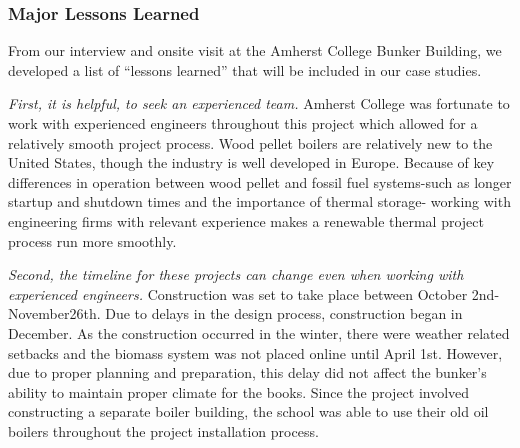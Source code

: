 \subsubsection{Major Lessons Learned}
\par From our interview and onsite visit at the Amherst College Bunker Building, we developed a list of “lessons learned” that will be included in our case studies. 
\par \emph{First, it is helpful,  to seek an experienced team.} Amherst College was fortunate to work with experienced engineers throughout this project which allowed for a relatively smooth project process. Wood pellet boilers are relatively new to the United States, though the industry is well developed in Europe. Because of key differences in operation between wood pellet and fossil fuel systems-such as longer startup and shutdown times and the importance of thermal storage- working with engineering firms with relevant experience makes a renewable thermal project process run more smoothly.
\par \emph{Second, the timeline for these projects can change even when working with experienced engineers.} Construction was set to take place between October 2nd-November26th. Due to delays in the design process, construction began in December. As the construction occurred in the winter, there were weather related setbacks and the biomass system was not placed online until April 1st. However, due to proper planning and preparation, this delay did not affect the bunker’s ability to maintain proper climate for the books. Since the project involved constructing a separate boiler building, the school was able to use their old oil boilers throughout the project installation process.

